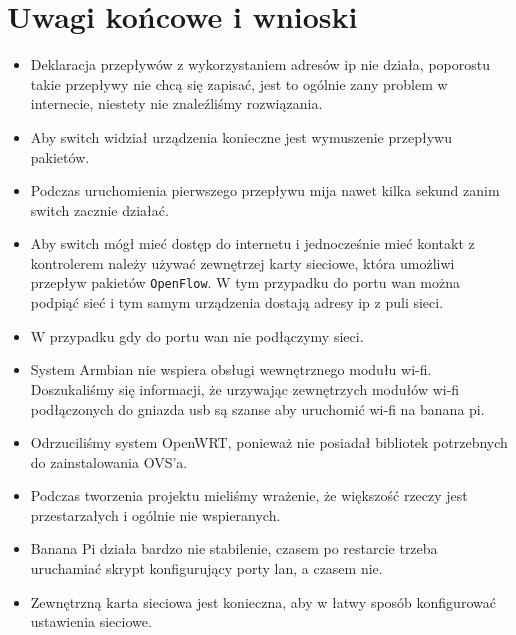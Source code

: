 \documentclass[12pt,a4paper,twoside]{article}
\begin{document}
\section{Uwagi końcowe i wnioski}
\begin{itemize}
	\item Deklaracja przepływów z wykorzystaniem adresów ip nie działa, poporostu takie przepływy nie chcą się zapisać, jest to ogólnie zany problem w internecie, niestety nie znaleźliśmy rozwiązania. 
	\item Aby switch widział urządzenia konieczne jest wymuszenie przepływu pakietów.
	\item Podczas uruchomienia pierwszego przepływu mija nawet kilka sekund zanim switch zacznie działać.
	\item Aby switch mógł mieć dostęp do internetu i jednocześnie mieć kontakt z kontrolerem należy używać zewnętrzej karty sieciowe, która umożliwi przepływ pakietów \texttt{OpenFlow}. W tym przypadku do portu wan można podpiąć sieć i tym samym urządzenia dostają adresy ip z puli sieci.
	\item W przypadku gdy do portu wan nie podłączymy sieci.
	\item System Armbian nie wspiera obsługi wewnętrznego modułu wi-fi. Doszukaliśmy się informacji, że urzywając zewnętrzych modułów wi-fi podłączonych do gniazda usb są szanse aby uruchomić wi-fi na banana pi. 
	\item Odrzuciliśmy system OpenWRT, ponieważ nie posiadał bibliotek potrzebnych do zainstalowania OVS'a.
	\item Podczas tworzenia projektu mieliśmy wrażenie, że większość rzeczy jest przestarzałych i ogólnie nie wspieranych.
	\item Banana Pi działa bardzo nie stabilenie, czasem po restarcie trzeba uruchamiać skrypt konfigurujący porty lan, a czasem nie.
	\item Zewnętrzną karta sieciowa jest konieczna, aby w łatwy sposób konfigurować ustawienia sieciowe.
	
\end{itemize}
\end{document}
